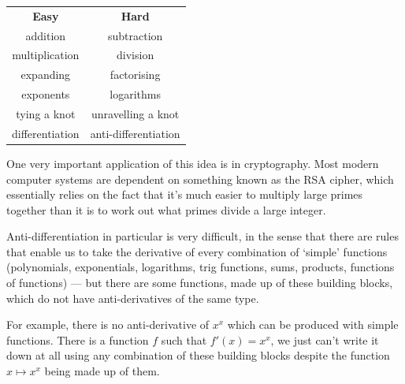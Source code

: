 \begin{center}
  \begin{tabular}{c|c}
    \textbf{Easy} & \textbf{Hard}\\
    addition & subtraction\\
    multiplication & division\\
    expanding & factorising\\
    exponents & logarithms\\
    tying a knot & unravelling a knot\\
    differentiation & anti-differentiation
  \end{tabular}
\end{center}

One very important application of this idea is in cryptography. Most modern computer
systems are dependent on something known as the RSA cipher, which essentially relies
on the fact that it's much easier to multiply large primes together than it is to
work out what primes divide a large integer.

Anti-differentiation in particular is very difficult, in the sense that there are
rules that enable us to take the derivative of every combination of `simple' functions
(polynomials, exponentials, logarithms, trig functions, sums, products, functions of
functions) --- but there are some functions, made up of these building blocks, which
do not have anti-derivatives of the same type.

For example, there is no anti-derivative of $ x^x $ which can be produced with simple
functions. There is a function $ f $ such that $ f'(x) = x^x $, we just can't write it
down at all using any combination of these building blocks despite the function $ x \mapsto x^x $
being made up of them.

